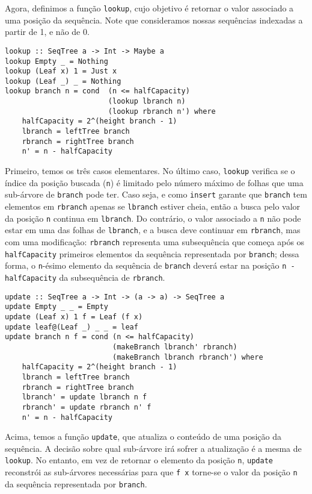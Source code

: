 \documentclass[a4paper]{article}
\begin{document}
Agora, definimos a função \texttt{lookup}, cujo objetivo é retornar o valor associado a uma posição da sequência.
Note que consideramos nossas sequências indexadas a partir de 1, e não de 0.

\begin{verbatim}
lookup :: SeqTree a -> Int -> Maybe a
lookup Empty _ = Nothing
lookup (Leaf x) 1 = Just x
lookup (Leaf _) _ = Nothing
lookup branch n = cond  (n <= halfCapacity)
                        (lookup lbranch n)
                        (lookup rbranch n') where
	halfCapacity = 2^(height branch - 1)
	lbranch = leftTree branch
	rbranch = rightTree branch
	n' = n - halfCapacity
\end{verbatim}

Primeiro, temos os três casos elementares.
No último caso, \texttt{lookup} verifica se o índice da posição buscada (\texttt{n}) é limitado pelo número máximo de folhas que uma sub-árvore de \texttt{branch} pode ter.
Caso seja, e como \texttt{insert} garante que \texttt{branch} tem elementos em \texttt{rbranch} apenas se \texttt{lbranch} estiver cheia, então a busca pelo valor da posição \texttt{n} continua em \texttt{lbranch}.
Do contrário, o valor associado a \texttt{n} não pode estar em uma das folhas de \texttt{lbranch}, e a busca deve continuar em \texttt{rbranch}, mas com uma modificação: \texttt{rbranch} representa uma subsequência que começa após os \texttt{halfCapacity} primeiros elementos da sequência representada por \texttt{branch}; dessa forma, o \texttt{n}-ésimo elemento da sequência de \texttt{branch} deverá estar na posição \texttt{n - halfCapacity} da subsequência de \texttt{rbranch}.

\begin{verbatim}
update :: SeqTree a -> Int -> (a -> a) -> SeqTree a
update Empty _ _ = Empty
update (Leaf x) 1 f = Leaf (f x)
update leaf@(Leaf _) _ _ = leaf
update branch n f = cond (n <= halfCapacity)
                         (makeBranch lbranch' rbranch)
                         (makeBranch lbranch rbranch') where
	halfCapacity = 2^(height branch - 1)
	lbranch = leftTree branch
	rbranch = rightTree branch
	lbranch' = update lbranch n f
	rbranch' = update rbranch n' f
	n' = n - halfCapacity
\end{verbatim}

Acima, temos a função \texttt{update}, que atualiza o conteúdo de uma posição da sequência.
A decisão sobre qual sub-árvore irá sofrer a atualização é a mesma de \texttt{lookup}.
No entanto, em vez de retornar o elemento da posição \texttt{n}, \texttt{update} reconstrói as sub-árvores necessárias para que \texttt{f x} torne-se o valor da posição \texttt{n} da sequência representada por \texttt{branch}.
\end{document}
